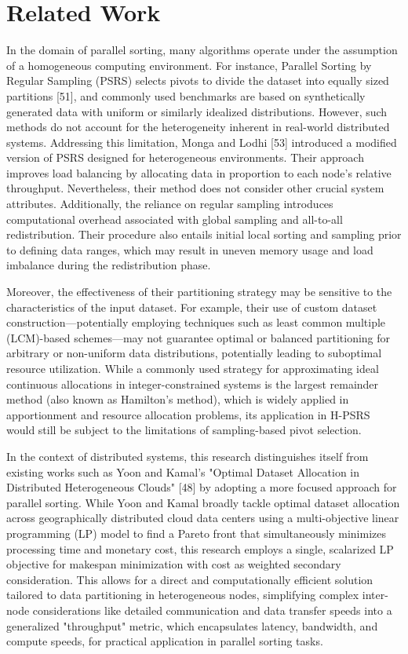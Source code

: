 \documentclass[]{interact}
\theoremstyle{plain}
\theoremstyle{definition}
\theoremstyle{remark}
\begin{document}
\section{Related Work}
\label{sec:related_work}
In the domain of parallel sorting, many algorithms operate under the assumption of a homogeneous computing environment. For instance, Parallel Sorting by Regular Sampling (PSRS) selects pivots to divide the dataset into equally sized partitions [51], and commonly used benchmarks are based on synthetically generated data with uniform or similarly idealized distributions. However, such methods do not account for the heterogeneity inherent in real-world distributed systems. Addressing this limitation, Monga and Lodhi [53] introduced a modified version of PSRS designed for heterogeneous environments. Their approach improves load balancing by allocating data in proportion to each node’s relative throughput. Nevertheless, their method does not consider other crucial system attributes. Additionally, the reliance on regular sampling introduces computational overhead associated with global sampling and all-to-all redistribution. Their procedure also entails initial local sorting and sampling prior to defining data ranges, which may result in uneven memory usage and load imbalance during the redistribution phase.

Moreover, the effectiveness of their partitioning strategy may be sensitive to the characteristics of the input dataset. For example, their use of custom dataset construction—potentially employing techniques such as least common multiple (LCM)-based schemes—may not guarantee optimal or balanced partitioning for arbitrary or non-uniform data distributions, potentially leading to suboptimal resource utilization. While a commonly used strategy for approximating ideal continuous allocations in integer-constrained systems is the largest remainder method (also known as Hamilton's method), which is widely applied in apportionment and resource allocation problems, its application in H-PSRS would still be subject to the limitations of sampling-based pivot selection.

In the context of distributed systems, this research distinguishes itself from existing works such as Yoon and Kamal's "Optimal Dataset Allocation in Distributed Heterogeneous Clouds" [48] by adopting a more focused approach for parallel sorting. While Yoon and Kamal broadly tackle optimal dataset allocation across geographically distributed cloud data centers using a multi-objective linear programming (LP) model to find a Pareto front that simultaneously minimizes processing time and monetary cost, this research employs a single, scalarized LP objective for makespan minimization with cost as weighted secondary consideration. This allows for a direct and computationally efficient solution tailored to data partitioning in heterogeneous nodes, simplifying complex inter-node considerations like detailed communication and data transfer speeds into a generalized "throughput" metric, which encapsulates latency, bandwidth, and compute speeds, for practical application in parallel sorting tasks.
\end{document}
